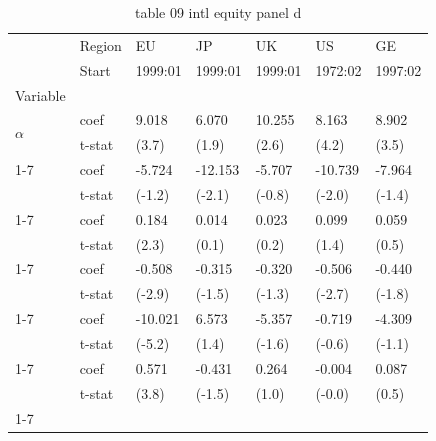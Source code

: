 \begin{table}[htbp]
  \centering
  \caption{table 09 intl equity panel d}
  \label{tab:table_09_intl_equity_panel_d}
  \begin{tabular}{lllllll}
\toprule
 & Region & EU & JP & UK & US & GE \\
 & Start & 1999:01 & 1999:01 & 1999:01 & 1972:02 & 1997:02 \\
Variable &  &  &  &  &  &  \\
\midrule
\multirow[t]{2}{*}{$\alpha$} & coef & 9.018 & 6.070 & 10.255 & 8.163 & 8.902 \\
 & t-stat & (3.7) & (1.9) & (2.6) & (4.2) & (3.5) \\
\cline{1-7}
\multirow[t]{2}{*}{$I_{B\sigma^2}$} & coef & -5.724 & -12.153 & -5.707 & -10.739 & -7.964 \\
 & t-stat & (-1.2) & (-2.1) & (-0.8) & (-2.0) & (-1.4) \\
\cline{1-7}
\multirow[t]{2}{*}{$R^e_m$} & coef & 0.184 & 0.014 & 0.023 & 0.099 & 0.059 \\
 & t-stat & (2.3) & (0.1) & (0.2) & (1.4) & (0.5) \\
\cline{1-7}
\multirow[t]{2}{*}{$I_B R^e_m$} & coef & -0.508 & -0.315 & -0.320 & -0.506 & -0.440 \\
 & t-stat & (-2.9) & (-1.5) & (-1.3) & (-2.7) & (-1.8) \\
\cline{1-7}
\multirow[t]{2}{*}{$\hat{\sigma}^2_m R^e_m$} & coef & -10.021 & 6.573 & -5.357 & -0.719 & -4.309 \\
 & t-stat & (-5.2) & (1.4) & (-1.6) & (-0.6) & (-1.1) \\
\cline{1-7}
\multirow[t]{2}{*}{$I_{B\sigma^2} R^e_m$} & coef & 0.571 & -0.431 & 0.264 & -0.004 & 0.087 \\
 & t-stat & (3.8) & (-1.5) & (1.0) & (-0.0) & (0.5) \\
\cline{1-7}
\bottomrule
\end{tabular}

\end{table}
